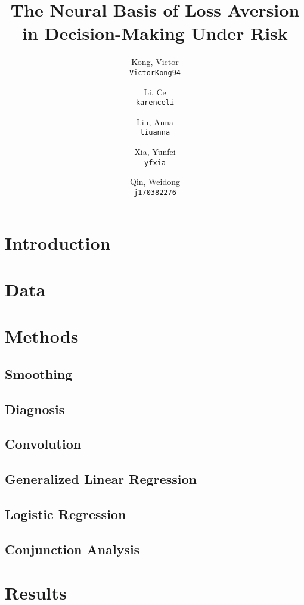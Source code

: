 \documentclass[11pt]{article}
\title{The Neural Basis of Loss Aversion in Decision-Making Under Risk}
\author{
  Kong, Victor\\
  \texttt{VictorKong94}
  \and
  Li, Ce\\
  \texttt{karenceli}
  \and
  Liu, Anna\\
  \texttt{liuanna}
  \and
  Xia, Yunfei\\
  \texttt{yfxia}
  \and
  Qin, Weidong\\
  \texttt{j170382276}
}
\begin{document}
\maketitle

\abstract{}

\section{Introduction}
        

\section{Data}
        

\section{Methods}

    \subsection{Smoothing}
            
    \subsection{Diagnosis}
            
    \subsection{Convolution}
            
    \subsection{Generalized Linear Regression}
            
    \subsection{Logistic Regression}
            
    \subsection{Conjunction Analysis}
            

\section{Results}
\end{document}

